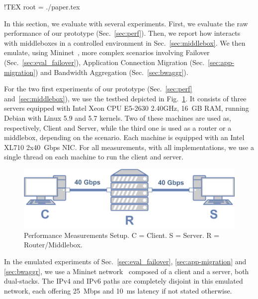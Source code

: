 %
!TEX root = ./paper.tex

In this section, we evaluate \tcpls with several experiments. First, we evaluate the raw performance of our \tcpls prototype (Sec.~\ref{sec:perf}). Then, we report how \tcpls interacts with middleboxes in a controlled environment in  Sec.~\ref{sec:middlebox}. We then emulate, using Mininet~\cite{handigol2012reproducible}, more complex scenarios involving
Failover (Sec.~\ref{sec:eval_failover}), Application Connection Migration
(Sec.~\ref{sec:app-migration}) and Bandwidth Aggregation  (Sec.~\ref{sec:bwaggr}).

For the two first experiments of our \tcpls prototype (Sec.~\ref{sec:perf} and~\ref{sec:middlebox}), we use the testbed depicted in Fig.~\ref{fig:perf_testbed}. It consists of three servers equipped with Intel Xeon CPU E5-2630 2.40GHz, 16~GB RAM, running Debian with Linux 5.9 and 5.7 kernels. Two of these machines are used as, respectively, Client and Server, while the third one is used as a router or a middlebox, depending on the scenario. Each machine is equipped with an Intel XL710 2x40~Gbps NIC. For all measurements, with all implementations, we use a  single thread on each machine to run the client and server.

\begin{figure}[!t]
	\begin{center}
		\includegraphics[width=.6\columnwidth]{figures/testbed.png}
	\end{center}
	\caption{Performance Measurements Setup. C = Client. S = Server. R =
	Router/Middlebox.}
	\label{fig:perf_testbed}
\end{figure}

In the emulated experiments of Sec.~\ref{sec:eval_failover},
\ref{sec:app-migration} and \ref{sec:bwaggr}, we use a Mininet  network~\cite{handigol2012reproducible} composed of a client and a server, both
dual-stacks. The IPv4 and IPv6 paths are completely disjoint in this emulated
network, each offering 25~Mbps and 10~ms latency if not stated otherwise.





